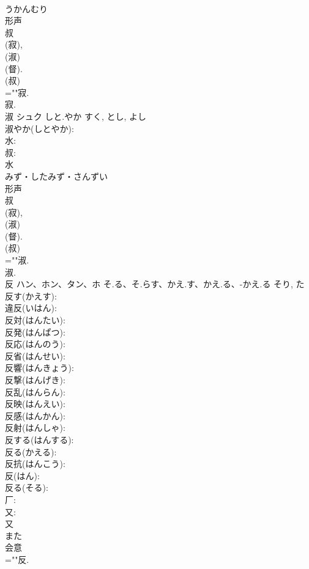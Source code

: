 \documentclass[8pt]{extreport}
\begin{document}
\begin{CJK}{UTF8}{min}
\\	うかんむり	
\\	形声 
\\	叔 
\\	(寂), 
\\	(淑) 
\\	(督). 
\\	(叔) 
\\	=""寂.
\\	寂.
\\	淑	シュク	しと.やか	すく, とし, よし	
\\	淑やか(しとやか): 
\\	水: 
\\	叔: 
\\	水	
\\	みず・したみず・さんずい	
\\	形声 
\\	叔 
\\	(寂), 
\\	(淑) 
\\	(督). 
\\	(叔) 
\\	=""淑.
\\	淑.
\\	反	ハン、ホン、タン、ホ	そ.る、そ.らす、かえ.す、かえ.る、-かえ.る	そり, た	
\\	反す(かえす): 
\\	違反(いはん): 
\\	反対(はんたい): 
\\	反発(はんぱつ): 
\\	反応(はんのう): 
\\	反省(はんせい): 
\\	反響(はんきょう): 
\\	反撃(はんげき): 
\\	反乱(はんらん): 
\\	反映(はんえい): 
\\	反感(はんかん): 
\\	反射(はんしゃ): 
\\	反する(はんする): 
\\	反る(かえる): 
\\	反抗(はんこう): 
\\	反(はん): 
\\	反る(そる): 
\\	厂: 
\\	又: 
\\	又	
\\	また	
\\	会意 
\\	=""反.

\end{CJK}
\end{document}
